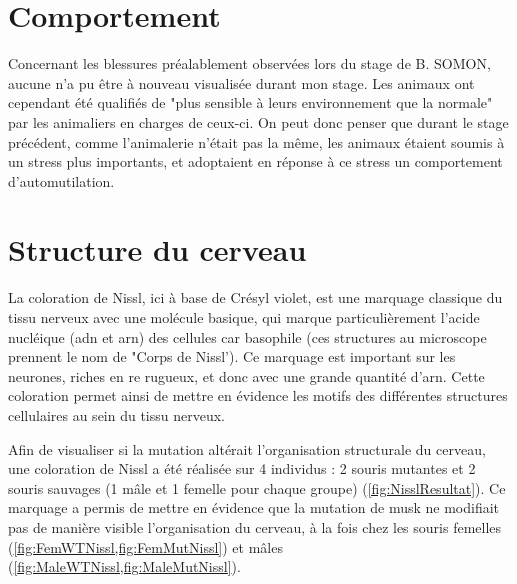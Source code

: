 \section{Comportement}
\label{sec:Comportement}
Concernant les blessures préalablement observées lors du stage de B. SOMON, aucune n'a pu être à nouveau visualisée durant mon stage. Les animaux ont cependant été qualifiés de "plus sensible à leurs environnement que la normale" par les animaliers en charges de ceux-ci. On peut donc penser que durant le stage précédent, comme l'animalerie n'était pas la même, les animaux étaient soumis à un stress plus importants, et adoptaient en réponse à ce stress un comportement d'automutilation.

\section{Structure du cerveau}
\label{sec:NisslResultat}
La coloration de Nissl, ici à base de Crésyl violet, est une marquage classique du tissu nerveux avec une molécule basique, qui marque particulièrement l'acide nucléique (\acrshort{adn} et \acrshort{arn}) des cellules car basophile (ces structures au microscope prennent le nom de "Corps de Nissl'). Ce marquage est important sur les neurones, riches en \gls{re} rugueux, et donc avec une grande quantité d'\acrshort{arn}. Cette coloration permet ainsi de mettre en évidence les motifs des différentes structures cellulaires au sein du tissu nerveux.

Afin de visualiser si la mutation \mcrd altérait l'organisation structurale du cerveau, une coloration de Nissl a été réalisée sur 4 individus : 2 souris mutantes et 2 souris sauvages (1 mâle et 1 femelle pour chaque groupe) (\cref{fig:NisslResultat}). Ce marquage a permis de mettre en évidence que la mutation de \gls{musk} ne modifiait pas de manière visible l'organisation du cerveau, à la fois chez les souris femelles (\cref{fig:FemWTNissl,fig:FemMutNissl}) et mâles (\cref{fig:MaleWTNissl,fig:MaleMutNissl}). 

